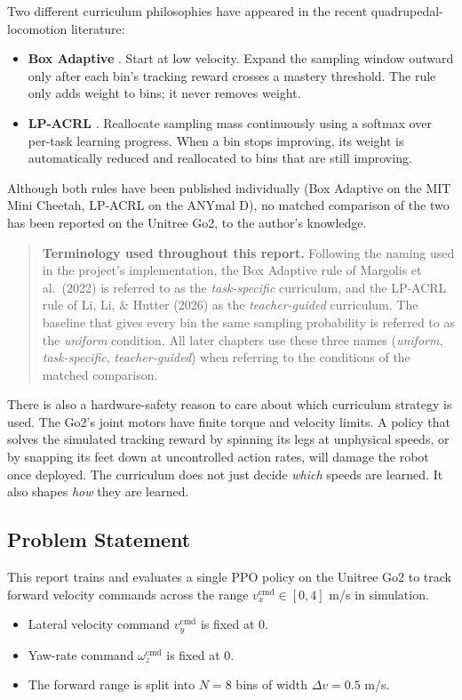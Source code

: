 Two different curriculum philosophies have appeared in the recent quadrupedal-locomotion literature:
\begin{itemize}
  \item \textbf{Box Adaptive} \cite{margolis2022}. Start at low velocity. Expand the sampling window outward only after each bin's tracking reward crosses a mastery threshold. The rule only adds weight to bins; it never removes weight.
  \item \textbf{LP-ACRL} \cite{li2026}. Reallocate sampling mass continuously using a softmax over per-task learning progress. When a bin stops improving, its weight is automatically reduced and reallocated to bins that are still improving.
\end{itemize}

Although both rules have been published individually (Box Adaptive on the MIT Mini Cheetah, LP-ACRL on the ANYmal D), no matched comparison of the two has been reported on the Unitree Go2, to the author's knowledge.

\begin{quote}
\textbf{Terminology used throughout this report.} Following the naming used in the project's implementation, the Box Adaptive rule of Margolis et al.\ (2022) is referred to as the \textit{task-specific} curriculum, and the LP-ACRL rule of Li, Li, \& Hutter (2026) as the \textit{teacher-guided} curriculum. The baseline that gives every bin the same sampling probability is referred to as the \textit{uniform} condition. All later chapters use these three names (\textit{uniform}, \textit{task-specific}, \textit{teacher-guided}) when referring to the conditions of the matched comparison.
\end{quote}

There is also a hardware-safety reason to care about which curriculum strategy is used. The Go2's joint motors have finite torque and velocity limits. A policy that solves the simulated tracking reward by spinning its legs at unphysical speeds, or by snapping its feet down at uncontrolled action rates, will damage the robot once deployed. The curriculum does not just decide \textit{which} speeds are learned. It also shapes \textit{how} they are learned.

\subsection{Problem Statement}

This report trains and evaluates a single PPO policy \cite{schulman2017} on the Unitree Go2 to track forward velocity commands across the range $v_x^{\mathrm{cmd}} \in [0, 4]$ m/s in simulation.
\begin{itemize}
  \item Lateral velocity command $v_y^{\mathrm{cmd}}$ is fixed at $0$.
  \item Yaw-rate command $\omega_z^{\mathrm{cmd}}$ is fixed at $0$.
  \item The forward range is split into $N = 8$ bins of width $\Delta v = 0.5$ m/s.
\end{itemize}

